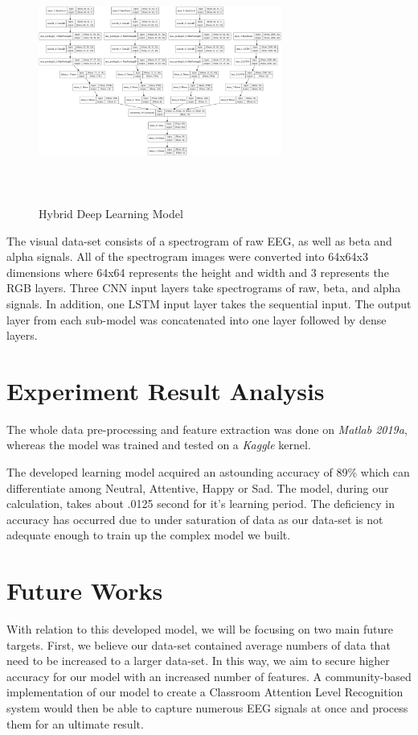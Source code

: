 \documentclass[conference]{IEEEtran}
\begin{document}
\begin{figure}[htbp]
\centerline{\includegraphics[width=8cm, height=8cm]{figures/cnn_lstm.png}}
\caption{Hybrid Deep Learning Model}
\label{fig}
\end{figure}

The visual data-set consists of a spectrogram of raw EEG, as well as beta and alpha signals. All of the spectrogram images were converted into 64x64x3 dimensions where 64x64 represents the height and width and 3 represents the RGB layers. Three CNN input layers take spectrograms of raw, beta, and alpha signals. In addition, one LSTM input layer takes the sequential input.  The output layer from each sub-model was concatenated into one layer followed by dense layers.

\section{Experiment Result Analysis}

The whole data pre-processing and feature extraction was done on \textit{Matlab 2019a}, whereas the model was trained and tested on a \textit{Kaggle} kernel.

The developed learning model acquired an astounding accuracy of 89\% which can differentiate among Neutral, Attentive, Happy or Sad. The model, during our calculation, takes about .0125 second for it's learning period. The deficiency in accuracy has occurred due to under saturation of data as our data-set is not adequate enough to train up the complex model we built. 

\section{Future Works}
With relation to this developed model, we will be focusing on two main future targets. First, we believe our data-set contained average numbers of data that need to be increased to a larger data-set. In this way, we aim to secure higher accuracy for our model with an increased number of features.  A community-based implementation of our model to create a Classroom Attention Level Recognition system would then be able to capture numerous EEG signals at once and process them for an ultimate result.
\end{document}
